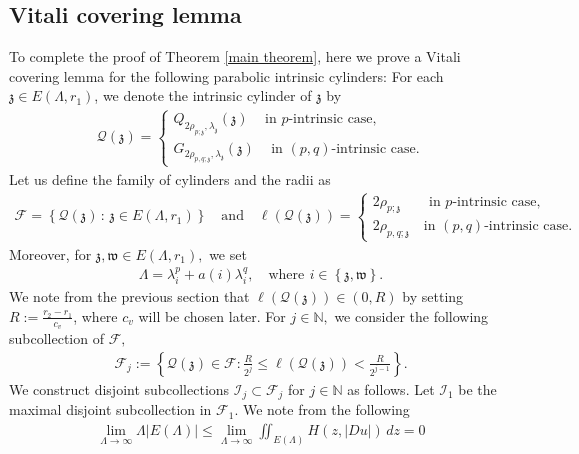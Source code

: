 \documentclass[notitlepage,11pt,reqno]{amsart}
\theoremstyle{definition}
\numberwithin{equation}{section}
\newcommand{\La}{\Lambda}
\newcommand{\NN}{\mathds{N}}
\begin{document}
\subsection{Vitali covering lemma} To complete the proof of Theorem \ref{main theorem}, here we prove a Vitali covering lemma for the following parabolic intrinsic cylinders: For each $\mathfrak{z}\in E(\Lambda,r_1)$, we denote the intrinsic cylinder of $\mathfrak{z}$ by
\begin{align*}
\displaystyle
\mathcal{Q}(\mathfrak{z})=\left\{\begin{array}{l}
Q_{2\rho_{p;\mathfrak{z}},\lambda_\mathfrak{z}}(\mathfrak{z}) \quad\,\text{in $p$-intrinsic case},\\
G_{2\rho_{p,q; \mathfrak{z}},\lambda_\mathfrak{z}}(\mathfrak{z}) \quad\,\text{in $(p, q)$-intrinsic case}.
\end{array}\right.
\end{align*}
Let us define the family of cylinders and the radii as
\begin{align*}
\mathcal{F}=\left\{\mathcal{Q}(\mathfrak{z})\, : \,\mathfrak{z}\in E(\Lambda,r_1)\right\}\quad \text{and} \quad \ell(\mathcal{Q}(\mathfrak{z}))=\left\{
    \begin{array}{l }
        2\rho_{p;\mathfrak{z}} \quad\,\,\,\,\,\, \text{in $p$-intrinsic case},\\
        2\rho_{p,q;\mathfrak{z}} \quad \text{in $(p,q)$-intrinsic case}.
    \end{array}
\right.
\end{align*} 
Moreover, for $\mathfrak{z}, \mathfrak{w}\in E(\Lambda, r_1),$ we set
\begin{align*}
    \Lambda=\lambda^p_{i}+a(i)\lambda^q_{i}, \quad \text{where} \ \, i\in \left\{\mathfrak{z}, \mathfrak{w}\right\}.
\end{align*}
We note from the previous section that $\ell(\mathcal{Q}(\mathfrak{z}))\in (0, R)$ by setting $R:=\frac{r_2-r_1}{c_v}$, where $c_v$ will be chosen later. For $j \in  \NN,$ we consider the following subcollection of $\mathcal{F},$
\begin{align*}
  \mathcal{F}_j:=\left\{\mathcal{Q}(\mathfrak{z})\in \mathcal{F} : \frac{R}{2^j}\leq \ell({\mathcal{Q}(\mathfrak{z})})<\frac{R}{2^{j-1}}\right\}.
\end{align*}
We construct disjoint subcollections $\mathcal{I}_j \subset \mathcal{F}_j$ for $j \in \NN$ as follows. Let $\mathcal{I}_1$ be the maximal disjoint  subcollection in $\mathcal{F}_1.$ We note from the following
\begin{align*}
    \lim_{\La\to \infty}\La|E(\Lambda)|\leq \lim_{\La \to \infty}\iint_{E(\Lambda)}H(z, |D u|)\, dz=0
\end{align*}
\end{document}

